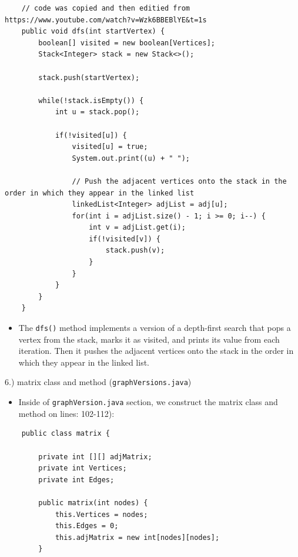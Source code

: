 \documentclass{article}
\begin{document}
\begin{verbatim}
    // code was copied and then editied from https://www.youtube.com/watch?v=Wzk6BBEBlYE&t=1s 
    public void dfs(int startVertex) {
        boolean[] visited = new boolean[Vertices];
        Stack<Integer> stack = new Stack<>();
    
        stack.push(startVertex);
    
        while(!stack.isEmpty()) {
            int u = stack.pop();
    
            if(!visited[u]) {
                visited[u] = true;
                System.out.print((u) + " ");
    
                // Push the adjacent vertices onto the stack in the order in which they appear in the linked list
                linkedList<Integer> adjList = adj[u];
                for(int i = adjList.size() - 1; i >= 0; i--) {
                    int v = adjList.get(i);
                    if(!visited[v]) {
                        stack.push(v);
                    }
                }
            }
        }
    }
\end{verbatim}

\begin{itemize}

\item The \verb|dfs()| method implements a version of a depth-first search that pops a vertex from the stack, marks it as visited, and prints its value from each iteration. Then it pushes the adjacent vertices onto the stack in the order in which they appear in the linked list. \\

\end{itemize}





\begin{large}
     6.) matrix class and method (\verb|graphVersions.java|)
\end{large}

\begin{itemize}

\item Inside of \verb|graphVersion.java| section, we construct the matrix class and method on lines: 102-112):

\end{itemize}

\begin{verbatim}
    public class matrix {

        private int [][] adjMatrix;
        private int Vertices;
        private int Edges;
    
        public matrix(int nodes) {
            this.Vertices = nodes;
            this.Edges = 0;
            this.adjMatrix = new int[nodes][nodes];
        }
\end{verbatim}
\end{document}
